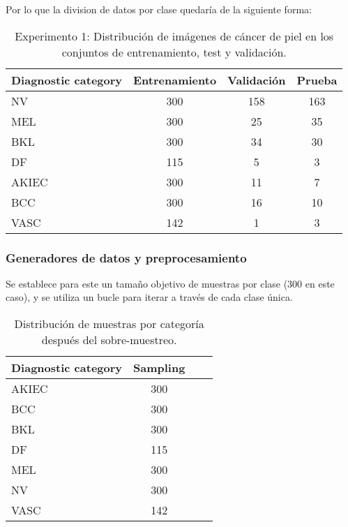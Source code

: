    Por lo que la division de datos por clase quedaría de la siguiente forma:

   \begin{table}[ht]
      \centering
      \begin{tabular}{lccc}
      \hline
      \textbf{Diagnostic category} & \textbf{Entrenamiento} & \textbf{Validación} & \textbf{Prueba} \\
      \hline
      NV       & 300 & 158 & 163 \\
      MEL      & 300 & 25  & 35  \\
      BKL      & 300 & 34  & 30  \\
      DF       & 115 & 5   & 3   \\
      AKIEC    & 300 & 11  & 7   \\
      BCC      & 300 & 16  & 10  \\
      VASC     & 142 & 1   & 3   \\ \hline
      \end{tabular}
      \caption{Experimento 1: Distribución de imágenes de cáncer de piel en los conjuntos de entrenamiento, test y validación.}
      \label{table:train_test_validate_e1}
      \end{table}
   
\subsubsection*{Generadores de datos y preprocesamiento}

Se establece para este un tamaño objetivo de muestras por clase ($300$ en este caso), y se utiliza un bucle para iterar a través de cada clase única.

\begin{table}[ht]
   \centering
   \begin{tabular}{lccc}
   \hline
   Diagnostic category & Sampling  \\ \hline
   AKIEC & 300 \\
   BCC & 300 \\
   BKL & 300 \\
   DF & 115 \\
   MEL & 300 \\
   NV & 300 \\
   VASC & 142 \\ \hline
   \end{tabular}
   \caption{Distribución de muestras por categoría después del sobre-muestreo.}
   \label{tab:sampling_distribution_1}
   \end{table}



